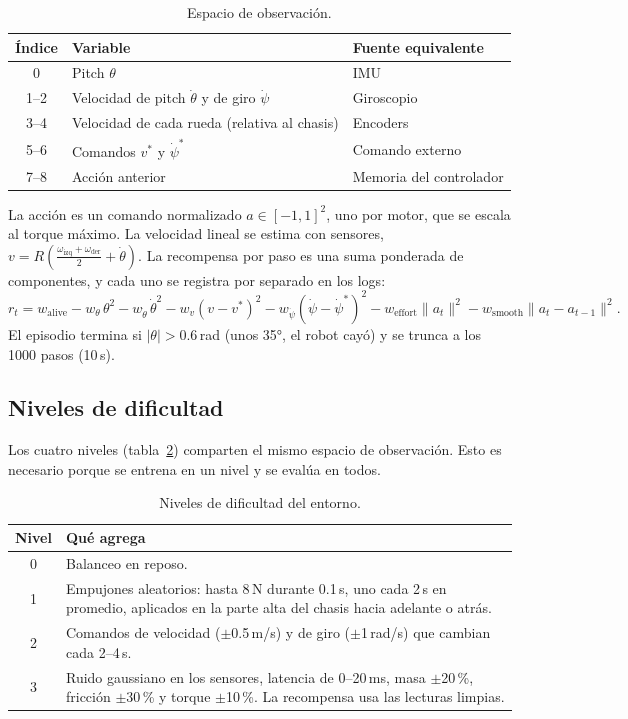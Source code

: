\documentclass[11pt,a4paper]{article}
\newcommand{\SI}[2]{#1\,#2}  %
\begin{document}
\begin{table}[H]
\centering
\caption{Espacio de observación.}
\label{tab:obs}
\begin{tabular}{@{}cll@{}}
\toprule
Índice & Variable & Fuente equivalente \\
\midrule
0 & Pitch $\theta$ & IMU \\
1--2 & Velocidad de pitch $\dot\theta$ y de giro $\dot\psi$ & Giroscopio \\
3--4 & Velocidad de cada rueda (relativa al chasis) & Encoders \\
5--6 & Comandos $v^*$ y $\dot\psi^*$ & Comando externo \\
7--8 & Acción anterior & Memoria del controlador \\
\bottomrule
\end{tabular}
\end{table}

La acción es un comando normalizado $a\in[-1,1]^2$, uno por motor, que se escala al torque máximo. La velocidad lineal se estima con sensores, $v = R\left(\tfrac{\omega_\text{izq}+\omega_\text{der}}{2} + \dot\theta\right)$. La recompensa por paso es una suma ponderada de componentes, y cada uno se registra por separado en los logs:
\begin{equation}
r_t = w_\text{alive} - w_\theta\,\theta^2 - w_{\dot\theta}\,\dot\theta^2 - w_v (v-v^*)^2 - w_{\dot\psi}(\dot\psi-\dot\psi^*)^2 - w_\text{effort}\lVert a_t\rVert^2 - w_\text{smooth}\lVert a_t-a_{t-1}\rVert^2 .
\end{equation}
El episodio termina si $|\theta|>0.6$\,rad (unos 35°, el robot cayó) y se trunca a los 1000 pasos (\SI{10}{s}).

\subsection{Niveles de dificultad}

Los cuatro niveles (tabla~\ref{tab:niveles}) comparten el mismo espacio de observación. Esto es necesario porque se entrena en un nivel y se evalúa en todos.

\begin{table}[H]
\centering
\caption{Niveles de dificultad del entorno.}
\label{tab:niveles}
\begin{tabularx}{\textwidth}{@{}cX@{}}
\toprule
Nivel & Qué agrega \\
\midrule
0 & Balanceo en reposo. \\
1 & Empujones aleatorios: hasta \SI{8}{N} durante \SI{0.1}{s}, uno cada \SI{2}{s} en promedio, aplicados en la parte alta del chasis hacia adelante o atrás. \\
2 & Comandos de velocidad ($\pm$\SI{0.5}{m/s}) y de giro ($\pm$\SI{1}{rad/s}) que cambian cada 2--\SI{4}{s}. \\
3 & Ruido gaussiano en los sensores, latencia de 0--\SI{20}{ms}, masa $\pm$20\,\%, fricción $\pm$30\,\% y torque $\pm$10\,\%. La recompensa usa las lecturas limpias. \\
\bottomrule
\end{tabularx}
\end{table}
\end{document}
